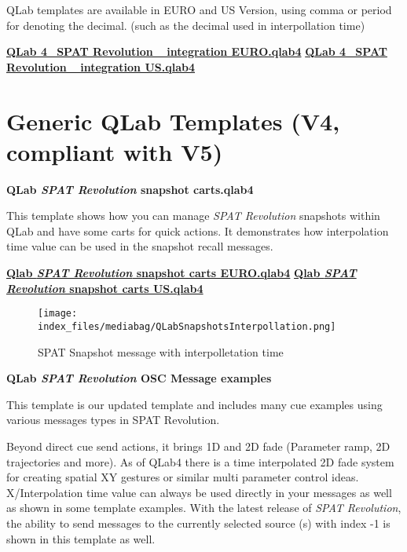\documentclass[
  letterpaper,
  DIV=11,
  numbers=noendperiod]{scrreport}
\begin{document}
QLab templates are available in EURO and US Version, using comma or
period for denoting the decimal. (such as the decimal used in
interpollation time)

\textbf{\href{https://public.3.basecamp.com/p/vhf67dYdBTHhwbtVJV4y227i}{QLab
4\_SPAT Revolution\_ integration EURO.qlab4}}
\textbf{\href{https://public.3.basecamp.com/p/oi3GoHpToVmEqijVV7F4QhJq}{QLab
4\_SPAT Revolution\_ integration US.qlab4}}

\hypertarget{generic-qlab-templates-v4-compliant-with-v5}{%
\section{Generic QLab Templates (V4, compliant with
V5)}\label{generic-qlab-templates-v4-compliant-with-v5}}

\textbf{QLab \emph{SPAT Revolution} snapshot carts.qlab4}

This template shows how you can manage \emph{SPAT Revolution} snapshots
within QLab and have some carts for quick actions. It demonstrates how
interpolation time value can be used in the snapshot recall messages.

\textbf{\href{https://public.3.basecamp.com/p/gC6XhzQjmEqpgFDRx7AXjuDL}{Qlab
\emph{SPAT Revolution} snapshot carts EURO.qlab4}}
\textbf{\href{https://public.3.basecamp.com/p/F4qR1QAXYVY5iA2Jt67si5ow}{Qlab
\emph{SPAT Revolution} snapshot carts US.qlab4}}

\begin{figure}

{\centering \texttt{[image: index\_files/mediabag/QLabSnapshotsInterpollation.png]}

}

\caption{SPAT Snapshot message with interpolletation time}

\end{figure}

\textbf{QLab \emph{SPAT Revolution} OSC Message examples}

This template is our updated template and includes many cue examples
using various messages types in SPAT Revolution.

Beyond direct cue send actions, it brings 1D and 2D fade (Parameter
ramp, 2D trajectories and more). As of QLab4 there is a time
interpolated 2D fade system for creating spatial XY gestures or similar
multi parameter control ideas. X/Interpolation time value can always be
used directly in your messages as well as shown in some template
examples. With the latest release of \emph{SPAT Revolution}, the ability
to send messages to the currently selected source (s) with index -1 is
shown in this template as well.
\end{document}
